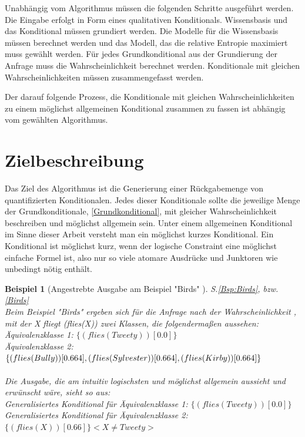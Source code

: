 \documentclass[draft]{scrreprt}
\newtheorem{Bsp}{Beispiel}[section]
\begin{document}
Unabhängig vom Algorithmus müssen die folgenden Schritte ausgeführt werden. Die Eingabe erfolgt in Form eines qualitativen Konditionals. Wissensbasis und das Konditional müssen grundiert werden. Die Modelle für die Wissensbasis müssen berechnet werden und das Modell, das die relative Entropie maximiert muss gewählt werden. Für jedes Grundkonditional aus der Grundierung der Anfrage muss die Wahrscheinlichkeit berechnet werden. Konditionale mit gleichen Wahrscheinlichkeiten müssen zusammengefasst werden. 

Der darauf folgende Prozess, die Konditionale mit gleichen Wahrscheinlichkeiten zu einem möglichst allgemeinen Konditional zusammen zu fassen ist abhängig vom gewählten Algorithmus.

\section{Zielbeschreibung} \label{Zielbeschreibung}                                                                                                                                                                   
Das Ziel des Algorithmus ist die Generierung einer Rückgabemenge von quantifizierten Konditionalen. Jedes dieser Konditionale sollte die jeweilige Menge der Grundkonditionale, \ref{Grundkonditional}, mit gleicher Wahrscheinlichkeit beschreiben und möglichst allgemein sein. Unter einem allgemeinen Konditional im Sinne dieser Arbeit versteht man ein möglichst kurzes Konditional. Ein Konditional ist möglichst kurz, wenn der logische Constraint eine möglichst einfache Formel ist, also nur so viele atomare Ausdrücke und Junktoren wie unbedingt nötig enthält.


\begin{Bsp}[Angestrebte Ausgabe am Beispiel "{}Birds"{} ]
	\label{Ausgabe_Birds}
S.\ref{Bsp:Birds}, bzw.  \ref{Birds}\\
	Beim Beispiel "{}Birds"{} ergeben sich für die Anfrage nach der Wahrscheinlichkeit , mit der X fliegt (flies(X)) zwei Klassen, die folgendermaßen aussehen:\\
	
	\noindent
			Äquivalenzklasse 1: $\{(flies(Tweety))[0.0]\}$\\
			Äquivalenzklasse 2: $\{(flies(Bully))[0.664], (flies(Sylvester))[0.664],\\ (flies(Kirby))[0.664]\}$\\
			\\
			Die Ausgabe, die am intuitiv logischsten und möglichst allgemein aussieht und erwünscht wäre, sieht so aus:\\
			   	Generalisiertes Konditional für Äquivalenzklasse 1: $\{(flies(Tweety))[0.0]\}$\\
				Generalisiertes Konditional für Äquivalenzklasse 2: $\{(flies(X))[0.66]\} <X \neq Tweety>$\\
\end{Bsp}
\end{document}
